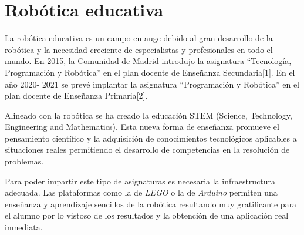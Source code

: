 \section{Robótica educativa}
La robótica educativa es un campo en auge debido al gran desarrollo de la robótica y la necesidad creciente de especialistas y profesionales en todo el mundo. En 2015, la Comunidad de Madrid introdujo la asignatura “Tecnología, Programación y Robótica” en el plan docente de Enseñanza Secundaria[1]. En el año 2020- 2021 se prevé implantar la asignatura “Programación y Robótica” en el plan docente de Enseñanza Primaria[2]. 

Alineado con la robótica se ha creado la educación STEM (Science, Technology, Engineering and Mathematics). Esta nueva forma de enseñanza promueve el pensamiento científico y la adquisición de conocimientos tecnológicos aplicables a situaciones reales permitiendo el desarrollo de competencias en la resolución de problemas.

Para poder impartir este tipo de asignaturas es necesaria la infraestructura adecuada. Las plataformas como la de \textit{LEGO} o la de \textit{Arduino} permiten una enseñanza y aprendizaje sencillos de la robótica resultando muy gratificante para el alumno por lo vistoso de los resultados y la obtención de una aplicación real inmediata.

